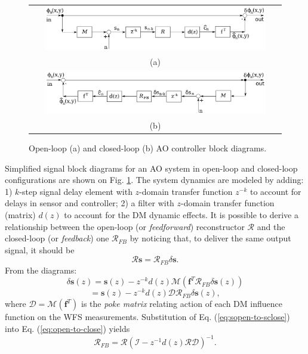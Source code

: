 \begin{figure}[htp]
\begin{center}
\begin{tabular}{c}
 \includegraphics[width = 0.9\textwidth]{Forward.png} \\
 (a) \\
 \includegraphics[width = 0.9\textwidth]{Back.png} \\
 (b) \\
\end{tabular}
\end{center}
\caption{Open-loop (a) and closed-loop (b) AO controller block diagrams.}
\label{fig:forward-back}
\end{figure}

Simplified signal block diagrams for an AO system in open-loop and closed-loop
configurations are shown on Fig. \ref{fig:forward-back}.
The system dynamics are modeled by adding: 1)
$k$-step signal delay element with $z$-domain transfer function $z^{-k}$ to
account for delays in sensor and controller; 2) a filter with $z$-domain
transfer function (matrix) $d(z)$ to account for the DM dynamic
effects. It is possible to derive a relationship between the open-loop (or
\emph{feedforward})
reconstructor $\mathcal{R}$ and the closed-loop (or \emph{feedback}) one
$\mathcal{R}_{FB}$ by noticing that, to deliver the same output signal, it
should be
\begin{equation} \label{eq:open-to-close}
  \mathcal{R} \bm{s} = \mathcal{R}_{FB} \delta \bm{s}.
\end{equation}
From the diagrams:
\begin{equation} \label{eq:sopen-to-sclose}
	\delta \bm{s}(z) = \bm{s}(z) - z^{-k} d(z) \mathcal{M} ( \bm{f}^{T}
	\mathcal{R}_{FB} \delta \bm{s}(z) )
\end{equation}
$$
  = \bm{s}(z) - z^{-k} d(z) \mathcal{DR}_{FB} \delta \bm{s}(z),
$$
where $\mathcal{D} = \mathcal{M} (\bm{f}^{T})$ is the \emph{poke matrix}
relating action of each DM influence function on the WFS measurements.
Substitution of Eq. (\ref{eq:sopen-to-sclose}) into Eq.
(\ref{eq:open-to-close}) yields
\begin{equation} \label{eq:fw-to-fb}
	\mathcal{R}_{FB} = \mathcal{R}
	( \mathcal{I} - z^{-1} d(z) \mathcal{RD} )^{-1}.
\end{equation}

